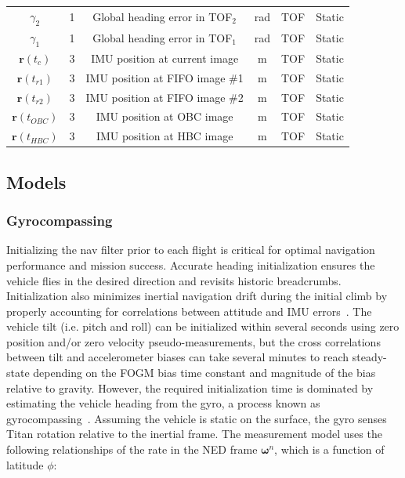 \begin{table}[htbp]
\begin{tabular}{| c | c | c | c | c | c |}
      $\gamma_{2}$ & 1 & Global heading error in TOF$_{2}$ & rad & TOF & Static \\
      $\gamma_{1}$ & 1 & Global heading error in TOF$_{1}$ & rad & TOF & Static \\ 
      $\bm{r}\left(t_{c}\right)$ & 3 & IMU position at current image & m & TOF & Static \\
      $\bm{r}\left(t_{r1}\right)$ & 3 & IMU position at FIFO image \#1 & m & TOF & Static \\ 
      $\bm{r}\left(t_{r2}\right)$ & 3 & IMU position at FIFO image \#2 & m & TOF & Static \\ 
      $\bm{r}\left(t_{OBC}\right)$ & 3 & IMU position at OBC image & m & TOF & Static \\ 
      $\bm{r}\left(t_{HBC}\right)$ & 3 & IMU position at HBC image & m & TOF & Static \\
      \hline
   \end{tabular}
\end{table}

\subsection{Models}

\subsubsection{Gyrocompassing}

Initializing the nav filter prior to each flight is critical for optimal navigation performance and mission success. Accurate heading initialization ensures the vehicle flies in the desired direction and revisits historic breadcrumbs. Initialization also minimizes inertial navigation drift during the initial climb by properly accounting for correlations between attitude and \ac{IMU} errors~\cite{park}. The vehicle tilt (i.e. pitch and roll) can be initialized within several seconds using zero position and/or zero velocity pseudo-measurements, but the cross correlations between tilt and accelerometer biases can take several minutes to reach steady-state depending on the \ac{FOGM} bias time constant and magnitude of the bias relative to gravity. However, the required initialization time is dominated by estimating the vehicle heading from the gyro, a process known as gyrocompassing~\cite{savage2000strapdown}. Assuming the vehicle is static on the surface, the gyro senses Titan rotation relative to the inertial frame. The measurement model uses the following relationships of the rate in the \ac{NED} frame $\bm{\omega}^{n}$, which is a function of latitude $\phi$: 

